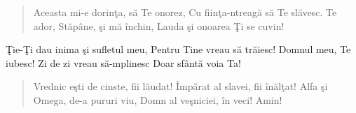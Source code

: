 
\begin{verse}
	Aceasta mi-e dorinţa, să Te onorez,
	Cu fiinţa-ntreagă să Te slăvesc.
	Te ador, Stăpâne, şi mă închin,
	Lauda şi onoarea Ţi se cuvin!
\end{verse}

\begin{chorus}
	Ţie-Ţi dau inima şi sufletul meu,
	Pentru Tine vreau să trăiesc!
	Domnul meu, Te iubesc!
	Zi de zi vreau să-mplinesc
	Doar sfântă voia Ta!
\end{chorus}

\begin{verse}
	Vrednic eşti de cinste, fii lăudat!
	Împărat al slavei, fii înălţat!
	Alfa şi Omega, de-a pururi viu,
	Domn al veşniciei, în veci! Amin!
\end{verse}

\endsong
